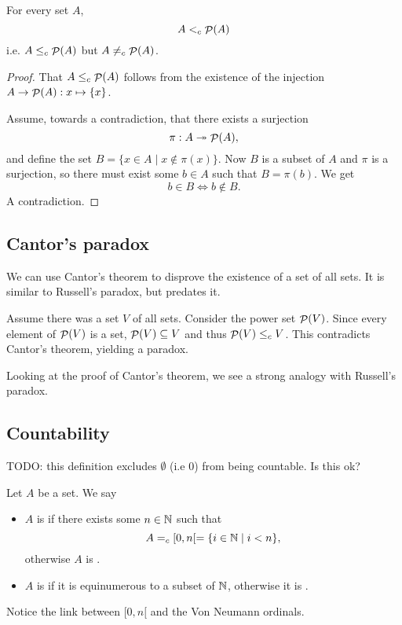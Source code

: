 \begin{theorem} \label{theorem:Cantor}
For every set $A$,
\[ A <_c \mathop{\mathcal{P}}(A) \]
i.e. $A\leq_c \mathop{\mathcal{P}}(A)$ but $A\neq_c \mathop{\mathcal{P}}(A)$.
\end{theorem}
\begin{proof}
That $A\leq_c \mathop{\mathcal{P}}(A)$ follows from the existence of the injection $A\to \mathop{\mathcal{P}}(A): x\mapsto \{x\}$.

Assume, towards a contradiction, that there exists a surjection
\[ \pi: A\twoheadrightarrow \mathop{\mathcal{P}}(A), \]
and define the set $B = \{x \in A \;|\; x \notin \pi(x)\}$.
Now $B$ is a subset of $A$ and $\pi$ is a surjection, so there must exist some $b \in A$ such that $B = \pi(b)$. We get
\[ b \in B \iff b \notin B. \]
A contradiction.
\end{proof}


\subsection{Cantor's paradox}
We can use Cantor's theorem to disprove the existence of a set of all sets. It is similar to Russell's paradox, but predates it.

Assume there was a set $V$ of all sets. Consider the power set $\mathop{\mathcal{P}}(V)$. Since every element of $\mathop{\mathcal{P}}(V)$ is a set, $\mathop{\mathcal{P}}(V) \subseteq V$ and thus $\mathop{\mathcal{P}}(V) \leq_c V$. This contradicts Cantor's theorem, yielding a paradox.

Looking at the proof of Cantor's theorem, we see a strong analogy with Russell's paradox.

\subsection{Countability}
TODO: this definition excludes $\emptyset$ (i.e $0$) from being countable. Is this ok?
\begin{definition}
Let $A$ be a set. We say
\begin{itemize}
\item $A$ is  if there exists some $n\in \mathbb{N}$ such that
\[ A =_c [0, n[ = \{i\in \mathbb{N}\;|\; i<n\}, \]
otherwise $A$ is .
\item $A$ is  if it is equinumerous to a subset of $\mathbb{N}$, otherwise it is .
\end{itemize}
\end{definition}
Notice the link between $[0,n[$ and the Von Neumann ordinals.

